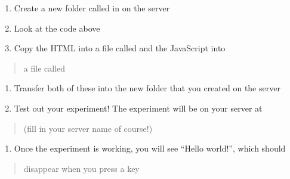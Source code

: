 \documentclass[letterpaper,10pt,english]{sphinxmanual}
\begin{document}
\begin{sphinxVerbatim}[commandchars=\\\{\}]
   
     
     

     \PYG{p}{[}\PYG{p}{]}
\end{sphinxVerbatim}
\begin{enumerate}
%
\item {} 
Create a new folder called  in  on the server

\item {} 
Look at the code above

\item {} 
Copy the HTML into a file called  and the JavaScript into

\end{enumerate}
\begin{quote}

a file called 
\end{quote}
\begin{enumerate}
%
\setcounter{enumi}{3}
\item {} 
Transfer both of these into the new folder that you created on the server

\item {} 
Test out your experiment! The experiment will be on your server at

\end{enumerate}
\begin{quote}

(fill in your server name of course!)
\end{quote}
\begin{enumerate}
%
\setcounter{enumi}{5}
\item {} 
Once the experiment is working, you will see “Hello world!”, which should

\end{enumerate}
\begin{quote}

disappear when you press a key
\end{quote}
\end{document}
